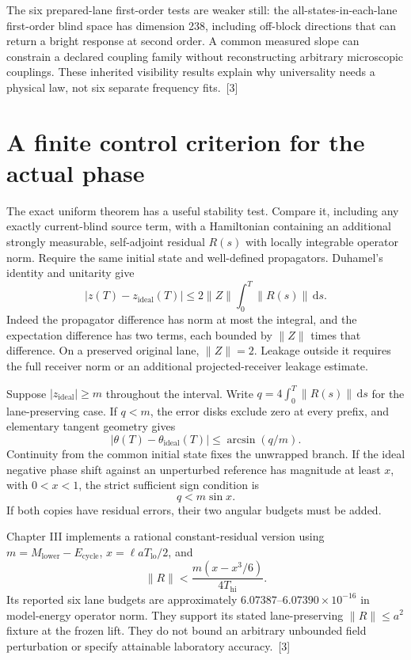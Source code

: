 \documentclass[10pt,twocolumn,letterpaper]{article}
\newcommand{\dd}{\mathrm{d}}
\begin{document}
The six prepared-lane first-order tests are weaker still: the all-states-in-each-lane first-order blind space has dimension 238, including off-block directions that can return a bright response at second order. A common measured slope can constrain a declared coupling family without reconstructing arbitrary microscopic couplings. These inherited visibility results explain why universality needs a physical law, not six separate frequency fits.~[3]


\section{A finite control criterion for the actual phase}
The exact uniform theorem has a useful stability test. Compare it, including any exactly current-blind source term, with a Hamiltonian containing an additional strongly measurable, self-adjoint residual $R(s)$ with locally integrable operator norm. Require the same initial state and well-defined propagators. Duhamel's identity and unitarity give
\[
 |z(T)-z_{\mathrm{ideal}}(T)|
 \le 2\|Z\|\int_0^T\|R(s)\|\,\dd s.
\]
Indeed the propagator difference has norm at most the integral, and the expectation difference has two terms, each bounded by $\|Z\|$ times that difference. On a preserved original lane, $\|Z\|=2$. Leakage outside it requires the full receiver norm or an additional projected-receiver leakage estimate.

Suppose $|z_{\mathrm{ideal}}|\ge m$ throughout the interval. Write $q=4\int_0^T\|R(s)\|\,\dd s$ for the lane-preserving case. If $q<m$, the error disks exclude zero at every prefix, and elementary tangent geometry gives
\[
 |\theta(T)-\theta_{\mathrm{ideal}}(T)|
 \le\arcsin(q/m).
\]
Continuity from the common initial state fixes the unwrapped branch. If the ideal negative phase shift against an unperturbed reference has magnitude at least $x$, with $0<x<1$, the strict sufficient sign condition is
\[
 q<m\sin x.
\]
If both copies have residual errors, their two angular budgets must be added.

Chapter III implements a rational constant-residual version using $m=M_{\mathrm{lower}}-E_{\mathrm{cycle}}$, $x=\ell aT_{\mathrm{lo}}/2$, and
\[
 \|R\|<\frac{m(x-x^3/6)}{4T_{\mathrm{hi}}}.
\]
Its reported six lane budgets are approximately $6.07387$--$6.07390\times 10^{-16}$ in model-energy operator norm. They support its stated lane-preserving $\|R\|\le a^2$ fixture at the frozen lift. They do not bound an arbitrary unbounded field perturbation or specify attainable laboratory accuracy.~[3]
\end{document}
